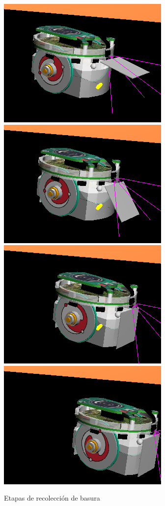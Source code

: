 \begin{figure}[htp]
\begin{center}
\includegraphics[scale=0.25]{comportamientos/figures/collect5.png}
\includegraphics[scale=0.25]{comportamientos/figures/collect6.png}
\includegraphics[scale=0.25]{comportamientos/figures/collect7.png}
\includegraphics[scale=0.25]{comportamientos/figures/collect8.png}
\caption{Etapas de recolecci\'on de basura}
\label{fig:recollection}
\end{center}
\end{figure}


